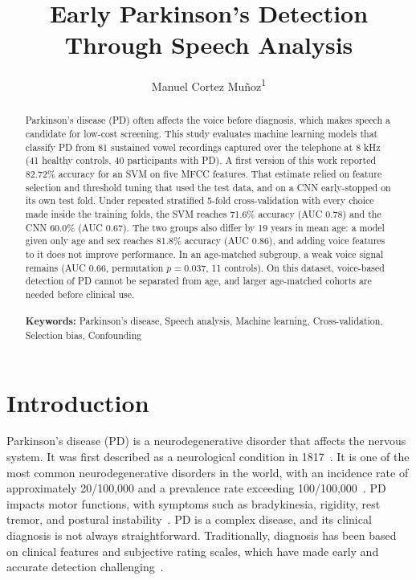 \documentclass{paper}
\title{Early Parkinson's Detection Through Speech Analysis}
\author{Manuel Cortez Muñoz\textsuperscript{1}}
\affiliation{School of Engineering, Universidad Autónoma de San Luis Potosí,
San Luis Potosí, México}
\begin{document}
\maketitle
\thispagestyle{firstpage}
\begin{abstract}
Parkinson's disease (PD) often affects the voice before diagnosis, which makes speech a candidate for low-cost screening. This study evaluates machine learning models that classify PD from 81 sustained vowel recordings captured over the telephone at 8 kHz (41 healthy controls, 40 participants with PD). A first version of this work reported 82.72\% accuracy for an SVM on five MFCC features. That estimate relied on feature selection and threshold tuning that used the test data, and on a CNN early-stopped on its own test fold. Under repeated stratified 5-fold cross-validation with every choice made inside the training folds, the SVM reaches 71.6\% accuracy (AUC 0.78) and the CNN 60.0\% (AUC 0.67). The two groups also differ by 19 years in mean age: a model given only age and sex reaches 81.8\% accuracy (AUC 0.86), and adding voice features to it does not improve performance. In an age-matched subgroup, a weak voice signal remains (AUC 0.66, permutation $p = 0.037$, 11 controls). On this dataset, voice-based detection of PD cannot be separated from age, and larger age-matched cohorts are needed before clinical use.
\\
\\
\textbf{Keywords:}
Parkinson's disease, Speech analysis, Machine learning, Cross-validation, Selection bias, Confounding
\end{abstract}

\section{Introduction}
Parkinson’s disease (PD) is a neurodegenerative disorder that affects the nervous system. It was first described as a neurological condition in 1817~\cite{bloem2021parkinson}. It is one of the most common neurodegenerative disorders in the world, with an incidence rate of approximately 20/100,000 and a prevalence rate exceeding 100/100,000~\cite{rajput2007epidemiology, von2005prevalence}. PD  impacts motor functions, with symptoms such as bradykinesia, rigidity, rest tremor, and postural instability~\cite{postuma2015mds, virameteekul2023clinical}. 
PD is a complex disease, and its clinical diagnosis is not always straightforward. Traditionally, diagnosis has been based on clinical features and subjective rating scales, which have made early and accurate detection challenging~\cite{schrag2002valid}.
\end{document}
